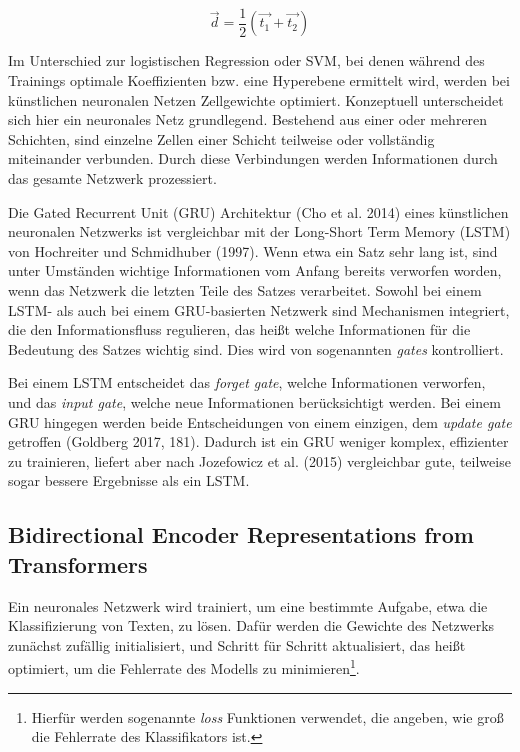 \begin{equation}
  \label{eq:eqn1}
    \vec{d} = \frac{1}{2} (\vec{t_{1}} + \vec{t_{2}})
\end{equation}

Im Unterschied zur logistischen Regression oder SVM, bei denen während des Trainings optimale Koeffizienten bzw. eine Hyperebene ermittelt wird, werden bei künstlichen neuronalen Netzen Zellgewichte optimiert. Konzeptuell unterscheidet sich hier ein neuronales Netz grundlegend. Bestehend aus einer oder mehreren Schichten, sind einzelne Zellen einer Schicht teilweise oder vollständig miteinander verbunden. Durch diese Verbindungen werden Informationen durch das gesamte Netzwerk prozessiert.

Die Gated Recurrent Unit (GRU) Architektur (Cho et al. 2014) eines künstlichen neuronalen Netzwerks ist vergleichbar mit der Long-Short Term Memory (LSTM) von Hochreiter und Schmidhuber (1997). Wenn etwa ein Satz sehr lang ist, sind unter Umständen wichtige Informationen vom Anfang bereits verworfen worden, wenn das Netzwerk die letzten Teile des Satzes verarbeitet. Sowohl bei einem LSTM- als auch bei einem GRU-basierten Netzwerk sind Mechanismen integriert, die den Informationsfluss regulieren, das heißt welche Informationen für die Bedeutung des Satzes wichtig sind. Dies wird von sogenannten \textit{gates} kontrolliert.

Bei einem LSTM entscheidet das \textit{forget gate}, welche Informationen verworfen, und das \textit{input gate}, welche neue Informationen berücksichtigt werden. Bei einem GRU hingegen werden beide Entscheidungen von einem einzigen, dem \textit{update gate} getroffen (Goldberg 2017, 181). Dadurch ist ein GRU weniger komplex, effizienter zu trainieren, liefert aber nach Jozefowicz et al. (2015) vergleichbar gute, teilweise sogar bessere Ergebnisse als ein LSTM.



\subsection{Bidirectional Encoder Representations from Transformers}
\label{finetunebert}
Ein neuronales Netzwerk wird trainiert, um eine bestimmte Aufgabe, etwa die Klassifizierung von Texten, zu lösen. Dafür werden die Gewichte des Netzwerks zunächst zufällig initialisiert, und Schritt für Schritt aktualisiert, das heißt optimiert, um die Fehlerrate des Modells zu minimieren\footnote{Hierfür werden sogenannte \textit{loss} Funktionen verwendet, die angeben, wie groß die Fehlerrate des Klassifikators ist.}.

